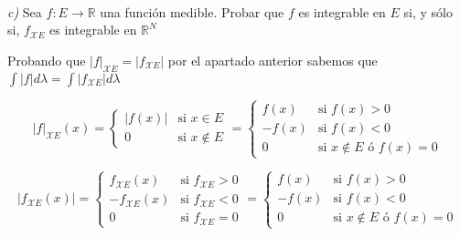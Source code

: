 \

\textit{c)} Sea $f:E\rightarrow\mathbb{R}$ una función medible. Probar que $f$ es integrable en $E$ si, y sólo si, $f_{\mathcal{X}E}$ es integrable en $\mathbb{R}^N$

Probando que $|f|_{\mathcal{X}E} = |f_{\mathcal{X}E}|$ por el apartado anterior sabemos que $\int|f|d\lambda = \int|f_{\mathcal{X}E}|d\lambda	$

\[ |f|_{\mathcal{X}E}(x) = \left\{
	\begin{matrix}
		|f(x)|	 & \mbox{si } x\in E
		\\	0	 & \mbox{si } x\not\in E	
	\end{matrix} \right.
	= \left\{
	\begin{matrix}
		f(x) 	& \mbox{si } f(x)>0
		\\-f(x) & \mbox{si } f(x)<0
		\\ 0		& \mbox{si } x\not\in E \mbox{ ó } f(x)=0
	\end{matrix} \right.
\]

\[ |f_{\mathcal{X}E}(x)| = \left\{
	\begin{matrix}
		f_{\mathcal{X}E}(x)  & \mbox{si } f_{\mathcal{X}E}>0
		\\ -f_{\mathcal{X}E}(x)  & \mbox{si } f_{\mathcal{X}E}<0
		\\ 0  & \mbox{si } f_{\mathcal{X}E}=0
	\end{matrix} \right.
	= \left\{
	\begin{matrix}
		f(x) 	& \mbox{si } f(x)>0
		\\-f(x) & \mbox{si } f(x)<0
		\\ 0		& \mbox{si } x\not\in E \mbox{ ó } f(x)=0
	\end{matrix} \right.
\]